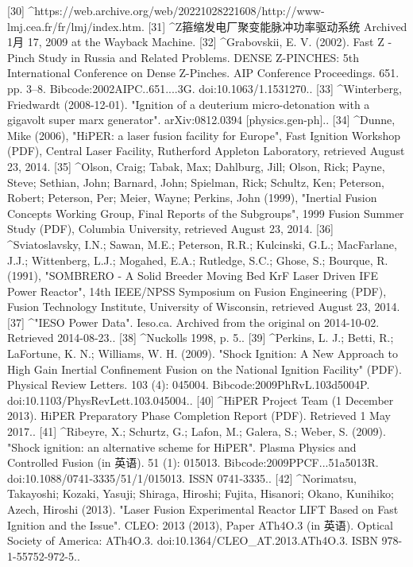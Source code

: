 [30]
^https://web.archive.org/web/20221028221608/http://www-lmj.cea.fr/fr/lmj/index.htm.
[31]
^Z箍缩发电厂聚变能脉冲功率驱动系统 Archived 1月 17, 2009 at the Wayback Machine.
[32]
^Grabovskii, E. V. (2002). Fast Z - Pinch Study in Russia and Related Problems. DENSE Z-PINCHES: 5th International Conference on Dense Z-Pinches. AIP Conference Proceedings. 651. pp. 3–8. Bibcode:2002AIPC..651....3G. doi:10.1063/1.1531270..
[33]
^Winterberg, Friedwardt (2008-12-01). "Ignition of a deuterium micro-detonation with a gigavolt super marx generator". arXiv:0812.0394 [physics.gen-ph]..
[34]
^Dunne, Mike (2006), "HiPER: a laser fusion facility for Europe", Fast Ignition Workshop (PDF), Central Laser Facility, Rutherford Appleton Laboratory, retrieved August 23, 2014.
[35]
^Olson, Craig; Tabak, Max; Dahlburg, Jill; Olson, Rick; Payne, Steve; Sethian, John; Barnard, John; Spielman, Rick; Schultz, Ken; Peterson, Robert; Peterson, Per; Meier, Wayne; Perkins, John (1999), "Inertial Fusion Concepts Working Group, Final Reports of the Subgroups", 1999 Fusion Summer Study (PDF), Columbia University, retrieved August 23, 2014.
[36]
^Sviatoslavsky, I.N.; Sawan, M.E.; Peterson, R.R.; Kulcinski, G.L.; MacFarlane, J.J.; Wittenberg, L.J.; Mogahed, E.A.; Rutledge, S.C.; Ghose, S.; Bourque, R. (1991), "SOMBRERO - A Solid Breeder Moving Bed KrF Laser Driven IFE Power Reactor", 14th IEEE/NPSS Symposium on Fusion Engineering (PDF), Fusion Technology Institute, University of Wisconsin, retrieved August 23, 2014.
[37]
^"IESO Power Data". Ieso.ca. Archived from the original on 2014-10-02. Retrieved 2014-08-23..
[38]
^Nuckolls 1998, p. 5..
[39]
^Perkins, L. J.; Betti, R.; LaFortune, K. N.; Williams, W. H. (2009). "Shock Ignition: A New Approach to High Gain Inertial Confinement Fusion on the National Ignition Facility" (PDF). Physical Review Letters. 103 (4): 045004. Bibcode:2009PhRvL.103d5004P. doi:10.1103/PhysRevLett.103.045004..
[40]
^HiPER Project Team (1 December 2013). HiPER Preparatory Phase Completion Report (PDF). Retrieved 1 May 2017..
[41]
^Ribeyre, X.; Schurtz, G.; Lafon, M.; Galera, S.; Weber, S. (2009). "Shock ignition: an alternative scheme for HiPER". Plasma Physics and Controlled Fusion (in 英语). 51 (1): 015013. Bibcode:2009PPCF...51a5013R. doi:10.1088/0741-3335/51/1/015013. ISSN 0741-3335..
[42]
^Norimatsu, Takayoshi; Kozaki, Yasuji; Shiraga, Hiroshi; Fujita, Hisanori; Okano, Kunihiko; Azech, Hiroshi (2013). "Laser Fusion Experimental Reactor LIFT Based on Fast Ignition and the Issue". CLEO: 2013 (2013), Paper ATh4O.3 (in 英语). Optical Society of America: ATh4O.3. doi:10.1364/CLEO_AT.2013.ATh4O.3. ISBN 978-1-55752-972-5..
